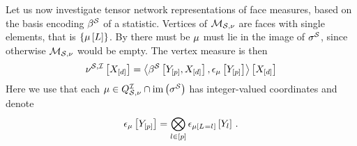 Let us now investigate tensor network representations of face measures, based on the basis encoding $\beta^{\mathcal{S}}$ of a statistic.
Vertices of $\mathcal{M}_{\mathcal{S},\nu}$ are faces with single elements, that is $\{\mu\left[L\right]\}$.
By  there must be $\mu$ must lie in the image of $\sigma^{\mathcal{S}}$, since otherwise $\mathcal{M}_{\mathcal{S},\nu}$ would be empty.
The vertex measure is then
\begin{align*}
    \nu^{\mathcal{S},\mathcal{I}}\left[X_{[d]}\right]
    = \left\langle \beta^{\mathcal{S}}\left[Y_{[p]},X_{[d]}\right],\epsilon_{\mu}\left[Y_{[p]}\right]\right\rangle \left[ X_{[d]} \right]
\end{align*}
Here we use that each $\mu\in Q^{\mathcal{I}}_{\mathcal{S},\nu}\cap\mathrm{im}\left(\sigma^{\mathcal{S}}\right)$ has integer-valued coordinates and denote
\begin{align*}
    \epsilon_{\mu}\left[Y_{[p]}\right] = \bigotimes_{l\in[p]} \epsilon_{\mu\left[L_{}=l_{}\right]}\left[Y_{l}\right] \, .
\end{align*}

